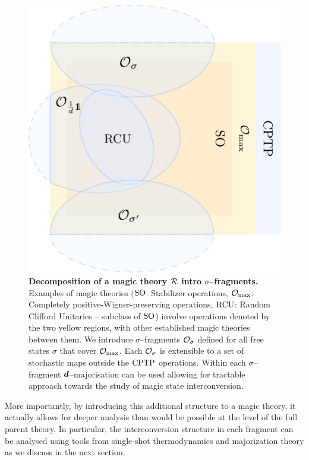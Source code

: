 \documentclass[pra,
aps,
twocolumn,
superscriptaddress,
groupedaddress,
nofootinbib,
reprint
]{revtex4-1}
\begin{document}
\begin{figure}[t]
    \centering
        \includegraphics[scale=0.3
        ]{figs/operations.pdf}
    \caption{\textbf{Decomposition of a magic theory $\mathcal{R}$ intro $\sigma$--fragments.} 
	Examples of magic theories (${\rm{SO}}$: Stabilizer operations, $\mathcal{O}_{\rm{max}}$: Completely positive-Wigner-preserving operations, ${\rm{RCU}}$: Random Clifford Unitaries -- subclass of ${\rm{SO}}$) involve operations denoted by the two yellow regions, with other established magic theories  between them.
    We introduce $\sigma$--fragments $\mathcal{O}_\sigma$ defined for all free states $\sigma$ that cover $\mathcal{O}_{\rm{max}}$. 
    Each $\mathcal{O}_\sigma$ is extensible to a set of stochastic maps outside the ${\rm{CPTP}}$ operations.
    Within each $\sigma$--fragment $\bm{d}$--majorisation can be used allowing for tractable approach towards the study of magic state interconversion.
    }
    \label{fig:zoo}
\end{figure}

More importantly, by introducing this additional structure to a magic theory, it actually allows for deeper analysis than would be possible at the level of the full parent theory. In particular, the interconversion structure in each fragment can be analysed using tools from single-shot thermodynamics and majorization theory as we discuss in the next section.
\end{document}
